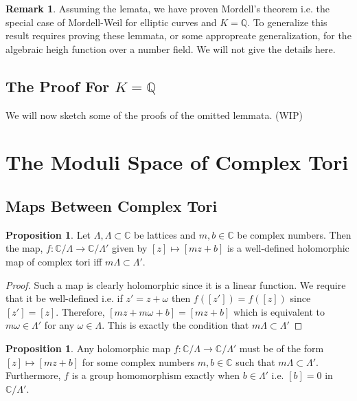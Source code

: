 \documentclass{article}
\newcommand{\Q}{\mathbb{Q}}
\newcommand{\C}{\mathbb{C}}
\theoremstyle{definition}
\newtheorem{proposition}[theorem]{Proposition}
\newtheorem{remark}{Remark}[section]
\begin{document}
\begin{remark}
Assuming the lemata, we have proven Mordell's theorem i.e. the special case of Mordell-Weil for elliptic curves and $K = \Q$. To generalize this result requires proving these lemmata, or some appropreate generalization, for the algebraic heigh function over a number field. We will not give the details here. 
\end{remark}


\subsection{The Proof For $K = \Q$}

We will now sketch some of the proofs of the omitted lemmata. (WIP)


\section{The Moduli Space of Complex Tori}

\subsection{Maps Between Complex Tori}

\begin{proposition}
Let $\Lambda, \Lambda \subset \C$ be lattices and $m, b \in \C$ be complex numbers. Then the map, $f : \C / \Lambda \to \C / \Lambda'$ given by $[z] \mapsto [m z + b]$ is a well-defined holomorphic map of complex tori iff $m \Lambda \subset \Lambda'$. 
\end{proposition}

\begin{proof}
Such a map is clearly holomorphic since it is a linear function. We require that it be well-defined i.e. if $z' = z + \omega$ then $f([z']) = f([z])$ since $[z'] = [z]$. Therefore, $[m z + m \omega + b] = [m z + b]$ which is equivalent to $m \omega \in \Lambda'$ for any $\omega \in \Lambda$. This is exactly the condition that $m \Lambda \subset \Lambda'$
\end{proof}

\begin{proposition}
Any holomorphic map $f : \C / \Lambda \to \C / \Lambda'$ must be of the form $[z] \mapsto [m z + b]$ for some complex numbers $m,b \in \C$ such that $m \Lambda \subset \Lambda'$. Furthermore, $f$ is a group homomorphism exactly when $b \in \Lambda'$ i.e. $[b] = 0$ in $\C / \Lambda'$.
\end{proposition}
\end{document}
